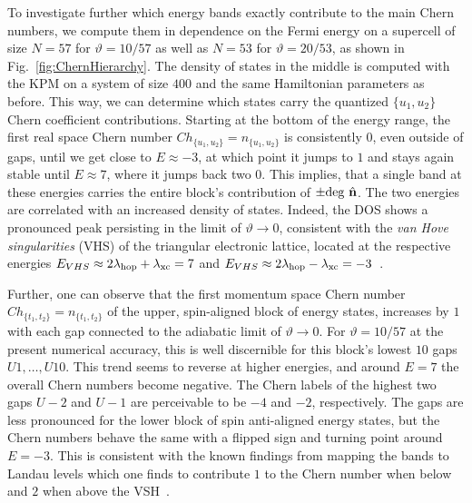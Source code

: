 \documentclass[submission, Phys]{SciPost}
\begin{document}
\figureIVa

To investigate further which energy bands exactly contribute to the main Chern numbers, we compute them in dependence on the Fermi energy on a supercell of size $N=57$ for $\vartheta=10/57$ as well as $N=53$ for $\vartheta=20/53$, as shown in Fig.~\ref{fig:ChernHierarchy}. 
The density of states in the middle is computed with the KPM on a system of size $400$ and the same Hamiltonian parameters as before.
This way, we can determine which states carry the quantized ${\lbrace u_1, u_2 \rbrace }$ Chern coefficient contributions.
Starting at the bottom of the energy range, the first real space Chern number $Ch_{\lbrace u_1, u_2 \rbrace }=n_{\lbrace u_1, u_2 \rbrace }$ is consistently $0$, even outside of gaps, until we get close to $E\approx -3$, at which point it jumps to $1$ and stays again stable until $E\approx 7$, where it jumps back two $0$.
This implies, that a single band at these energies carries the entire block's contribution of $\pm \mathrm{deg}~\hat{\mathbf{n}}$.
The two energies are correlated with an increased density of states. 
Indeed, the DOS shows a pronounced peak persisting in the limit of $\vartheta\to0$, consistent with the \emph{van Hove singularities} (VHS) of the triangular electronic lattice,  located at the respective energies $E_{VHS}\approx 2\lambda_\mathrm{hop}+\lambda_\mathrm{xc}=7$ and $E_{VHS}\approx 2\lambda_\mathrm{hop}-\lambda_\mathrm{xc}=-3$~\cite{Gobel2017}. 

Further, one can observe that the first momentum space Chern number $Ch_{\lbrace t_1, t_2 \rbrace }=n_{\lbrace t_1, t_2 \rbrace }$ of the upper, spin-aligned block of energy states, increases by $1$ with each gap connected to the adiabatic limit of $\vartheta\to 0$.
For $\vartheta=10/57$ at the present numerical accuracy, this is well discernible for this block's lowest $10$ gaps $U1,\dots,U10$.
This trend seems to reverse at higher energies, and around $E=7$ the overall Chern numbers become negative.
The Chern labels of the highest two gaps $U-2$ and $U-1$ are perceivable to be $-4$ and $-2$, respectively.
The gaps are less pronounced for the lower block of spin anti-aligned energy states, but the Chern numbers behave the same with a flipped sign and turning point around $E=-3$.
This is consistent with the known findings from mapping the bands to Landau levels which one finds to contribute $1$ to the Chern number when below and $2$ when above the VSH~\cite{Gobel2017}.

\figureVa
\end{document}
